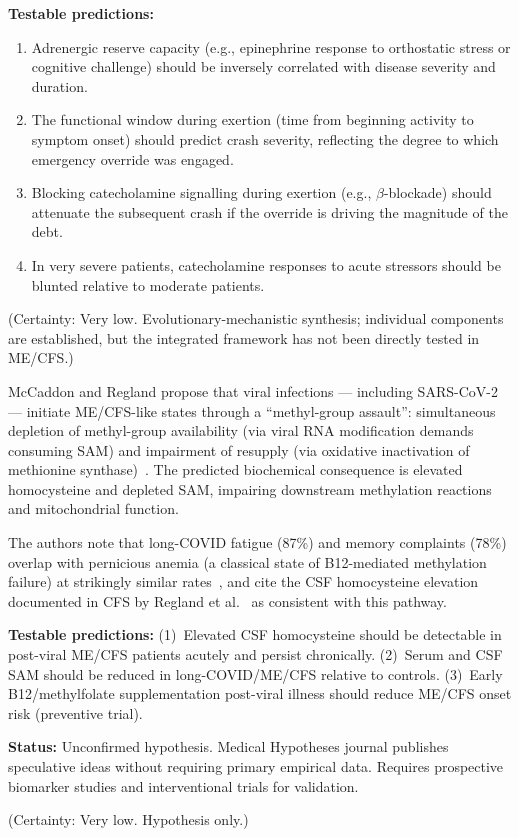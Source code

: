 \begin{speculation}
\textbf{Testable predictions:}
\begin{enumerate}
  \item Adrenergic reserve capacity (e.g., epinephrine response to orthostatic stress or
    cognitive challenge) should be inversely correlated with disease severity and duration.
  \item The functional window during exertion (time from beginning activity to symptom onset)
    should predict crash severity, reflecting the degree to which emergency override was engaged.
  \item Blocking catecholamine signalling during exertion (e.g., $\beta$-blockade) should
    attenuate the subsequent crash if the override is driving the magnitude of the debt.
  \item In very severe patients, catecholamine responses to acute stressors should be blunted
    relative to moderate patients.
\end{enumerate}

(Certainty: Very low. Evolutionary-mechanistic synthesis; individual components are established,
but the integrated framework has not been directly tested in ME/CFS.)
\end{speculation}


\begin{speculation}
\label{spec:methyl-assault-onset}
McCaddon and Regland propose that viral infections --- including SARS-CoV-2 --- initiate
ME/CFS-like states through a ``methyl-group assault'': simultaneous depletion of methyl-group
availability (via viral RNA modification demands consuming SAM) and impairment of resupply
(via oxidative inactivation of methionine synthase)~\cite{McCaddon2021}. The predicted
biochemical consequence is elevated homocysteine and depleted SAM, impairing downstream
methylation reactions and mitochondrial function.

The authors note that long-COVID fatigue (87\%) and memory complaints (78\%) overlap
with pernicious anemia (a classical state of B12-mediated methylation failure) at strikingly
similar rates~\cite{McCaddon2021}, and cite the CSF homocysteine elevation documented in
CFS by Regland et al.~\cite{Regland1997} as consistent with this pathway.

\textbf{Testable predictions:} (1)~Elevated CSF homocysteine should be detectable in
post-viral ME/CFS patients acutely and persist chronically. (2)~Serum and CSF SAM should be
reduced in long-COVID/ME/CFS relative to controls. (3)~Early B12/methylfolate supplementation
post-viral illness should reduce ME/CFS onset risk (preventive trial).

\textbf{Status:} Unconfirmed hypothesis. Medical Hypotheses journal publishes speculative
ideas without requiring primary empirical data. Requires prospective biomarker studies and
interventional trials for validation.

(Certainty: Very low. Hypothesis only.)
\end{speculation}


